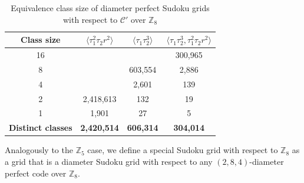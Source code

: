 \documentclass{article}
\theoremstyle{definition}
\begin{document}
\begin{table}[ht]
\centering
\renewcommand{\arraystretch}{1.4}
\begin{tabular}{|c|c|c|c|}
\hline
\textbf{Class size} & $\langle \tau_1^2 \tau_2 r^2 \rangle$ & $\langle \tau_1\tau_2^3 \rangle$ & $\langle \tau_1\tau_2^3, \tau_1^2 \tau_2 r^2 \rangle$ \\
\hline
16 &        &        & 300,965 \\
8  &        & 603,554  & 2,886 \\
4  &        & 2,601    & 139 \\
2  & 2,418,613 & 132     & 19 \\
1  & 1,901    & 27       & 5 \\
\hline
\textbf{Distinct classes} & \textbf{2,420,514} & \textbf{606,314} & \textbf{304,014} \\
\hline
\end{tabular}
\caption{Equivalence class size of diameter perfect Sudoku grids with respect to $\mathcal{C}'$ over $\mathbb{Z}_8$}
\label{tab:8x8-CpAp-symmetry-comparison}
\end{table}


Analogously to the $\mathbb{Z}_5$ case, we define a special Sudoku grid with respect to $\mathbb{Z}_8$ as a grid that is a diameter Sudoku grid with respect to any $(2, 8, 4)$-diameter perfect code over $\mathbb{Z}_8$.
\end{document}
